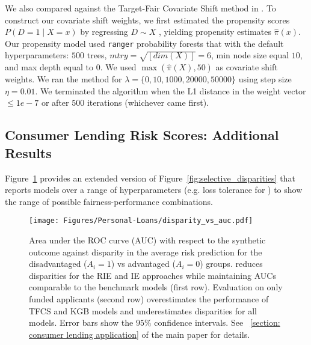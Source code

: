 \documentclass{article}
\begin{document}
We also compared against the Target-Fair Covariate Shift method in \cite{coston2019fair}. To construct our covariate shift weights, we first estimated the propensity scores  $P(D = 1 \mid X =x)$ by regressing  $D \sim X$ , yielding propensity estimates $\hat \pi(x)$. Our propensity model used  {\tt ranger} probability forests that with the default hyperparameters: $500$ trees, $mtry = \sqrt{[dim(X)]} = 6$, min node size equal $10$, and max depth equal to $0$. We used $\max(\hat \pi(X), 50)$ as covariate shift weights. We ran the method for $\lambda = \{0, 10, 1000, 20000, 50000\}$ using step size $\eta = 0.01$. We terminated the algorithm when the L1 distance in the weight vector $\leq 1e-7$ or after $500$ iterations (whichever came first). 

\subsection{Consumer Lending Risk Scores: Additional Results}\label{section: consumer lending additional results}
Figure~\ref{fig:selective_disparities extended} provides an extended version of Figure~\ref{fig:selective_disparities} that reports models over a range of hyperparameters (e.g. loss tolerance for \fairs) to show the range of possible fairness-performance combinations.

\begin{figure}[htbp!]
    \centering
    \texttt{[image: Figures/Personal-Loans/disparity\_vs\_auc.pdf]}
    \caption{Area under the ROC curve (AUC) with respect to the synthetic outcome against disparity in the average risk prediction for the disadvantaged ($A_i=1$) vs advantaged ($A_i=0$) groups.
    \fairs reduces disparities for the RIE and IE approaches while maintaining AUCs comparable to the benchmark models (first row). 
    Evaluation on only funded applicants (second row) overestimates the performance of TFCS and KGB models and underestimates disparities for all models.
    Error bars show the $95\%$ confidence intervals. See \textsection~\ref{section: consumer lending application} of the main paper for details.}
    \label{fig:selective_disparities extended}
\end{figure}
\end{document}
